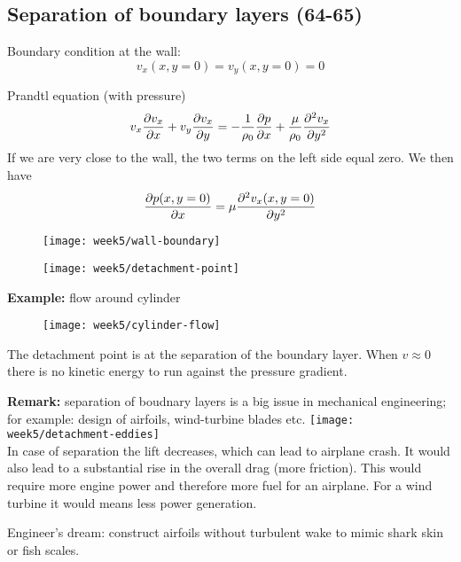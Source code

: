 \subsection{Separation of boundary layers (64-65)}

Boundary condition at the wall:
\begin{equation}
v_x(x,y=0) = v_y(x,y=0)=0
\end{equation}

Prandtl equation (with pressure)
\begin{equation}
v_x\frac{\partial v_x}{\partial x}+v_y\frac{\partial v_x}{\partial y} = -\frac{1}{\rho_0}\frac{\partial p}{\partial x}+\frac{\mu}{\rho_0}\frac{\partial^2 v_x}{\partial y^2}
\end{equation}
If we are very close to the wall, the two terms on the left side equal zero. We then have
\begin{equation}
\frac{\partial p(x,y=0)}{\partial x}=\mu\frac{\partial^2 v_x(x,y=0)}{\partial y^2}
\end{equation}

\begin{figure}[!h]
    \centering
    \texttt{[image: week5/wall-boundary]}\\
    \caption{}
    \label{fig:wall-boundary}
\end{figure}

\begin{figure}[!h]
    \centering
    \texttt{[image: week5/detachment-point]}\\
    \caption{}
    \label{fig:detachment-point}
\end{figure}

\newpage
\textbf{Example:} flow around cylinder

\begin{figure}[!h]
    \centering
    \texttt{[image: week5/cylinder-flow]}\\
    \caption{}
    \label{fig:cylinder-flow}
\end{figure}

The detachment point is at the separation of the boundary layer. When $v\approx0$ there is no kinetic energy to run against the pressure gradient.

\begin{framed}
\textbf{Remark:} separation of boudnary layers is a big issue in mechanical engineering; for example: design of airfoils, wind-turbine blades etc.
{\center
\texttt{[image: week5/detachment-eddies]}\\
}
In case of separation the lift decreases, which can lead to airplane crash. It would also lead to a substantial rise in the overall drag (more friction). This would require more engine power and therefore more fuel for an airplane. For a wind turbine it would means less power generation.

Engineer's dream: construct airfoils without turbulent wake to mimic shark skin or fish scales.
\end{framed}

